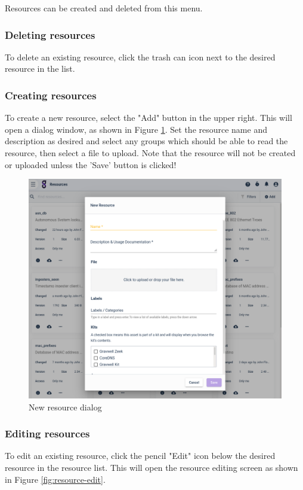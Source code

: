 Resources can be created and deleted from this menu.

\subsubsection{Deleting resources}

To delete an existing resource, click the trash can icon next to the
desired resource in the list. 

\subsubsection{Creating resources}

To create a new resource, select the "Add" button in the upper right. This
will open a dialog window, as shown in Figure \ref{fig:resource-new}.
Set the resource name and description as desired and select any groups
which should be able to read the resource, then select a file to upload.
Note that the resource will not be created or uploaded unless the 'Save'
button is clicked!

\begin{figure}
	\includegraphics[width=0.7\linewidth]{images/resource-new.png}
	\caption{New resource dialog}
	\label{fig:resource-new}
\end{figure}

\subsubsection{Editing resources}

To edit an existing resource, click the pencil "Edit" icon below the
desired resource in the resource list. This will open the resource
editing screen as shown in Figure \ref{fig:resource-edit}.

